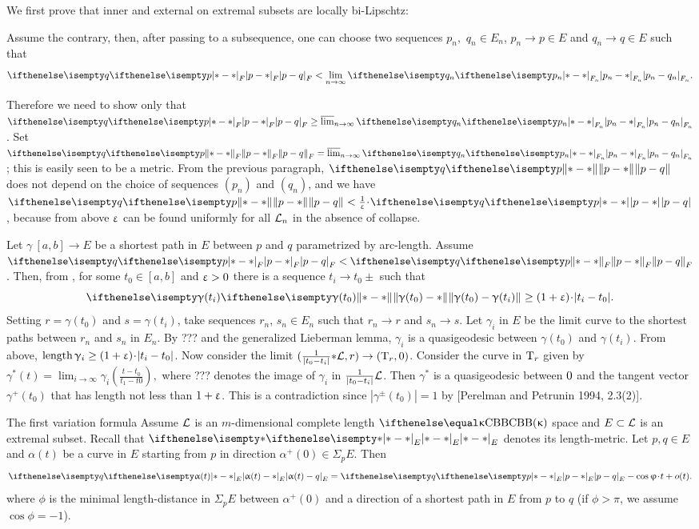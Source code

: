 We first prove that inner and external on extremal subsets are locally bi-Lipschtz:

Assume the contrary, then, after passing to a subsequence,
one can choose two sequences $p_n,$ $q_n \in E_n$, $p_n \to p\in E$ and $q_n \to q\in E$ such that
\[\dist{p}{q}{F} < \lim_{n\to\infty} \dist{p_n}{q_n}{F_n}.\]
 
Therefore we need to show only that
$\dist{p}{q}{F} \ge \limsup_{n\to\infty} \dist{p_n}{q_n}{F_n}$. 
Set $\yetdist{p}{q}{F}=\limsup_{n\to\infty}\dist{p_n}{q_n}{F_n}$; this is easily seen to be a metric. 
From the previous paragraph, $\yetdist{p}{q}{}$ does not depend on the choice of sequences $(p_n)$ and $(q_n)$, 
and we have $\yetdist{p}{q}{}<\tfrac{1}{\eps}\cdot\dist[{{}}]{p}{q}{}$, because from above $\upvarepsilon$ can be found uniformly for all $\mathcal{L}_n$ in the absence of collapse.

Let $\gamma\:[a,b]\to E$ be a shortest path in $E$ between $p$ and $q$ parametrized by arc-length. 
Assume $\dist{p}{q}{F}<\yetdist{p}{q}{F}$. 
Then, from \cite[5.14]{busemann}, for some
$t_0 \in[a, b]$ and $\upvarepsilon > 0$ there is a sequence $t_i \to t_0\pm$ such that
\[\yetdist{\gamma(t_0)}{\gamma(t_i)}{} \ge (1+\eps)\cdot|t_i-t_0|.\]
Setting $r = \gamma(t_0)$ and $s = \gamma(t_i)$, take sequences $r_n$, $s_n \in E_n$ such that $r_n \to r$ and $s_n \to s$. 
Let $\gamma_i$ in $E$ be the limit curve to the shortest paths between $r_n$ and $s_n$ in $E_n$. 
By \cite[2.3(3)]{perelman-petrunin:qg}??? and the generalized
Lieberman lemma, $\gamma_i$ is a quasigeodesic between $\gamma(t_0)$ and $\gamma(t_i)$. 
From above, $\length\gamma_i \ge (1 + \eps)\cdot|t_i - t_0 |$. 
Now consider the limit $(\tfrac{1}{|t_0-t_i |}\blow \spc{L}, r) \to (\T_r,\0)$.
Consider the curve in $\text{\rm T}_r$ given by
$\gamma^*(t) = \lim_{i\to\infty}\gamma_i(\frac{t-t_0}{t_1-t0}),$
where ??? denotes the image of $\gamma_i$ in $\frac{1}{|t_0-t_i |}\mathcal{L}$. 
Then $\gamma^*$ is a quasigeodesic between $0$ and the tangent vector $\gamma^+(t_0)$ that has length not less than $1 + \upvarepsilon$. 
This is a contradiction since $|\gamma^\pm(t_0)|=1$ by [Perelman and Petrunin 1994, 2.3(2)].



\begin{thm}{The first variation formula\cite[1.4]{petrunin:extremal}}\label{1st-var}
Assume $\mathcal{L}$ is an $m$-dimensional complete length $\Alex\kappa$ space and
$E\subset \spc{L}$ is an extremal subset.
Recall that $\dist{*}{*}{E}$ denotes its length-metric. 
Let $p,q \in E$ 
and $\alpha(t)$ be a curve in $E$ starting from $p$ in direction
$\alpha^+(0)\in \Sigma_p E$.
Then 
\[\dist{\alpha(t)}{q}{E}=\dist{p}{q}{E}-\cos\phi\cdot t + o(t).\]
where $\phi$ is the minimal length-distance in $\Sigma_p E$ between
$\alpha^+(0)$ and a direction of a shortest path in $E$ from $p$ to $q$ (if $\phi>\pi$, we assume $\cos\phi=-1$).
\end{thm}

